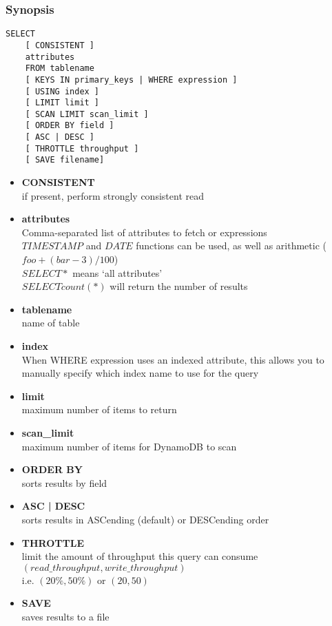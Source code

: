 \subsubsection{Synopsis}
\lstset{language=Java}
\begin{lstlisting}
SELECT
    [ CONSISTENT ]
    attributes
    FROM tablename
    [ KEYS IN primary_keys | WHERE expression ]
    [ USING index ]
    [ LIMIT limit ]
    [ SCAN LIMIT scan_limit ]
    [ ORDER BY field ]
    [ ASC | DESC ]
    [ THROTTLE throughput ]
    [ SAVE filename]	
\end{lstlisting}

\begin{itemize}
	\item \textbf{CONSISTENT} \\
	if present, perform strongly consistent read
	\item \textbf{attributes} \\
	Comma-separated list of attributes to fetch or expressions\\
	$TIMESTAMP$ and $DATE$ functions can be used, as well as arithmetic ($foo + (bar - 3) / 100$)\\
	$SELECT *$ means ‘all attributes’\\
	$SELECT count(*)$ will return the number of results
	\item \textbf{tablename} \\
	name of table
	\item \textbf{index} \\
	When WHERE expression uses an indexed attribute, this allows you to manually specify which index name to use for the query
	\item \textbf{limit} \\
	maximum number of items to return
	\item \textbf{scan\_limit} \\
	maximum number of items for DynamoDB to scan
	\item \textbf{ORDER BY} \\
	sorts results by field
	\item \textbf{ASC | DESC} \\
	sorts results in ASCending (default) or DESCending order
	\item \textbf{THROTTLE} \\
	limit the amount of throughput this query can consume\\
	$(read\_throughput, write\_throughput)$\\
	i.e. $(20\%, 50\%)$ or $(20, 50)$
	\item \textbf{SAVE} \\
	saves results to a file
\end{itemize}

